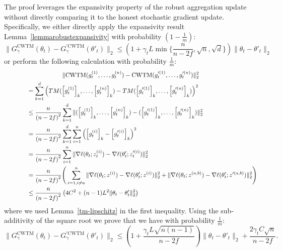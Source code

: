 \documentclass[twoside,11pt]{article}
\begin{document}
    The proof leverages the expansivity property of the robust aggregation update without directly comparing it to the honest stochastic gradient update.
    Specifically, we either directly apply the expansivity result Lemma~\ref{lemmarobustexpansivity} with probability $(1-\frac{1}{m})$: 
    \[
        \| G^{\mathrm{CWTM}}_{\gamma}(\theta_t) - G^{\prime \mathrm{CWTM}}_{\gamma}(\theta'_t) \|_2 \leq (1+\gamma_t L \min\{\frac{n}{n-2f}, \sqrt{n}, \sqrt{d}\}) \| \theta_t - \theta'_t \|_2
    \]
    or perform the following calculation with probability $\frac{1}{m}$:
    \begin{multline*}
        \| \mathrm{CWTM}(g^{(1)}_t, \ldots, g^{(n)}_t) - \mathrm{CWTM}(g^{\prime(1)}_t, \ldots, g^{\prime(n)}_t) \|_2^2 \\
        \qquad\qquad = \sum_{k=1}^d {\left( TM({\left[ g^{(1)}_t \right]}_k, \ldots, {\left[ g^{(n)}_t \right]}_k) - TM({\left[ g^{\prime(1)}_t \right]}_k, \ldots, {\left[ g^{\prime(n)}_t \right]}_k) \right)}^2 \hfill \\
        \qquad\qquad \leq \frac{n}{{(n-2f)}^2} \sum_{k=1}^d \| ({\left[ g^{(1)}_t \right]}_k, \ldots, {\left[ g^{(n)}_t \right]}_k) -  ({\left[ g^{\prime(1)}_t \right]}_k, \ldots, {\left[ g^{\prime(n)}_t \right]}_k) \|_2^2 \hfill \\
        \qquad\qquad = \frac{n}{{(n-2f)}^2} \sum_{k=1}^d \sum_{i=1}^n {\left( {\left[ g^{(i)}_t \right]}_k - {\left[ g^{\prime(i)}_t \right]}_k \right)}^2 \hfill \\
        \qquad\qquad = \frac{n}{{(n-2f)}^2} \sum_{i=1}^n \| \nabla \ell (\theta_t; z_t^{(i)}) - \nabla \ell (\theta'_t; z_t^{\prime(i)}) \|_2^2 \hfill \\
        \qquad\qquad = \frac{n}{{(n-2f)}^2} \Bigg(  \sum_{i=1, i \neq a}^n \| \nabla \ell (\theta_t; z^{(i)}) - \nabla \ell (\theta'_t; z^{(i)}) \|_2^2
        + \| \nabla \ell (\theta_t; z^{(a, b)}) - \nabla \ell (\theta'_t; z^{\prime(a, b)}) \|_2^2 \Bigg) \hfill \\
        \qquad\qquad \leq \frac{n}{{(n-2f)}^2} \left( 4C^2 + (n-1) L^2 \| \theta_t - \theta'_t \|_2^2 \right) \hfill
    \end{multline*}
    where we used Lemma~\ref{tm-lipschitz} in the first inequality. Using the sub-additivity of the square root we prove that we have with probability $\frac{1}{m}$:
    \[
        \| G^{\mathrm{CWTM}}_{\gamma}(\theta_t) - G^{\prime \mathrm{CWTM}}_{\gamma}(\theta'_t) \|_2 \leq (1+\frac{\gamma_t L \sqrt{n(n-1)}}{n-2f}) \| \theta_t - \theta'_t \|_2 + \frac{2 \gamma_t C \sqrt{n}}{n-2f}.
    \]
\end{document}
